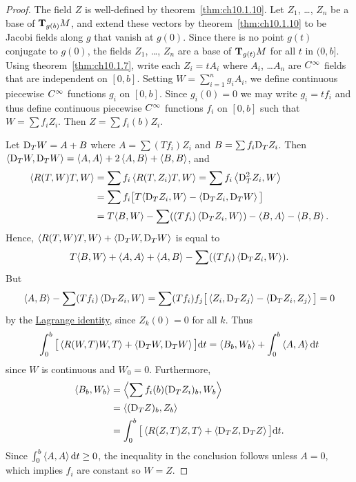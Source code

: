 \documentclass[../main]{subfiles}
\begin{document}
\begin{proof}
    The field $Z$ is well-defined by theorem~\ref{thm:ch10.1.10}. Let $Z_1$, \dots, $Z_n$ be a base of $\tangentspace{M}{g(b)}$, and extend these vectors by theorem~\ref{thm:ch10.1.10} to be Jacobi fields along $g$ that vanish at $g(0)$. Since there is no point $g(t)$ conjugate to $g(0)$, the fields $Z_1$, \dots, $Z_n$ are a base of $\tangentspace{M}{g(t)}$ for all $t$ in $(0,b]$. Using theorem~\ref{thm:ch10.1.7}, write each $Z_i = tA_i$ where $A_i$, \dots $A_n$ are $\CInfty$ fields that are independent on $[0,b]$. Setting $W = \sum_{i=1}^n g_i A_i$, we define continuous piecewise $\CInfty$ functions $g_i$ on $[0, b]$. Since $g_i(0) = 0$ we may write $g_i = tf_i$ and thus define continuous piecewise $\CInfty$ functions $f_i$ on $[0,b]$ such that $W = \displaystyle\sum f_i Z_i$. Then $Z = \displaystyle\sum f_i(b) Z_i$.

    Let $\connection_T W = A + B$ where $A = \sum (T{f_i}) Z_i$ and $B = \sum f_i \connection_T Z_i$. Then $\ip{\connection_T W}{\connection_T W} = \ip{A}{A} + 2\ip{A}{B} + \ip{B}{B}$, and
    \begin{align*}
        \ip{R(T, W)T}{W} &= \sum f_i \ip{R(T, Z_i)T}{W} = \sum f_i \ip{\connection_T^2 Z_i}{W} \\
        &= \sum f_i \big[ T{\ip{\connection_T Z_i}{W}} - \ip{\connection_T Z_i}{\connection_T W} \big] \\
        &= T{\ip{B}{W}} - \sum ((T{f_i}) \ip{\connection_T Z_i}{W}) - \ip{B}{A} - \ip{B}{B}\text{.}
    \end{align*}%
    Hence, $\ip{R(T, W)T}{W} + \ip{\connection_T W}{\connection_T W}$ is equal to
    \[ T{\ip{B}{W}} + \ip{A}{A} + \ip{A}{B} - \sum ((T{f_i}) \ip{\connection_T Z_i}{W})\text{.} \]
    But
    \[ \ip{A}{B} - \sum (T{f_i}) \ip{\connection_T Z_i}{W} = \sum (T{f_i}) f_j \big[ \ip{Z_i}{\connection_T Z_j} - \ip{\connection_T Z_i}{Z_j} \big] = 0 \]
    by the \hyperref[lem:ch10.2.8]{Lagrange identity}, since $Z_k(0) = 0$ for all $k$. Thus
    \[ \int_0^b \big[ \ip{R(W, T)W}{T} + \ip{\connection_T W}{\connection_T W} \big] \dd{t} = \ip{B_b}{ W_b} + \int_0^b \ip{A}{A} \dd{t} \]
    since $W$ is continuous and $W_0 = 0$. Furthermore,
    \begin{align*}
        \ip{B_b}{W_b} &= \ip{\sum f_i(b)(\connection_T Z_i)_b}{W_b} \\
        &= \ip{(\connection_T Z)_b}{Z_b} \\
        &= \int_0^b \big[ \ip{R(Z, T)Z}{T} + \ip{\connection_T Z}{\connection_T Z} \big] \dd{t}.
    \end{align*}%
    Since $\int_0^b \ip{A}{A} \dd{t} \geq 0$, the inequality in the conclusion follows unless $A = 0$, which implies $f_i$ are constant so $W = Z$.
\end{proof}
\end{document}
